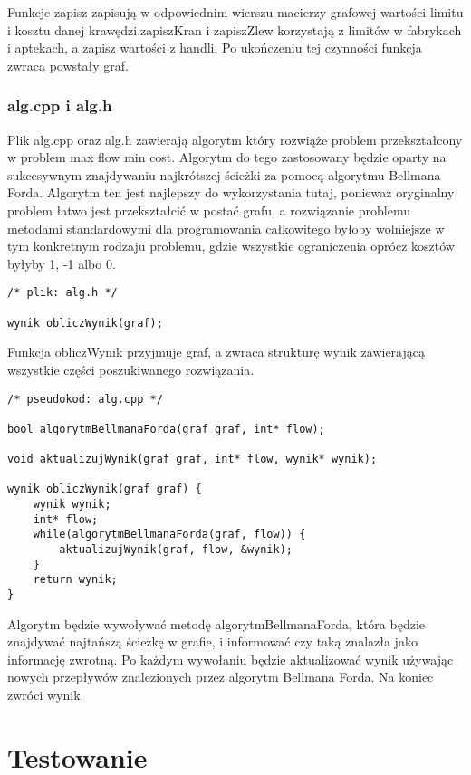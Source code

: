 \documentclass{article}
\begin{document}
Funkcje zapisz zapisują w odpowiednim wierszu macierzy grafowej wartości limitu i kosztu danej krawędzi.zapiszKran i zapiszZlew korzystają z limitów w fabrykach i aptekach, a zapisz wartości z handli. Po ukończeniu tej czynności funkcja zwraca powstały graf.

\subsubsection{alg.cpp i alg.h}

Plik alg.cpp oraz alg.h zawierają algorytm który rozwiąże problem przekształcony w problem max flow min cost. Algorytm do tego zastosowany będzie oparty na sukcesywnym znajdywaniu najkrótszej ścieżki za pomocą algorytmu Bellmana Forda. Algorytm ten jest najlepszy do wykorzystania tutaj, ponieważ oryginalny problem łatwo jest przekształcić w postać grafu, a rozwiązanie problemu metodami standardowymi dla programowania całkowitego byłoby wolniejsze w tym konkretnym rodzaju problemu, gdzie wszystkie ograniczenia oprócz kosztów byłyby 1, -1 albo 0.

\begin{lstlisting}
/* plik: alg.h */

wynik obliczWynik(graf);
\end{lstlisting}

Funkcja obliczWynik przyjmuje graf, a zwraca strukturę wynik zawierającą wszystkie części poszukiwanego rozwiązania.

\begin{lstlisting}
/* pseudokod: alg.cpp */

bool algorytmBellmanaForda(graf graf, int* flow);

void aktualizujWynik(graf graf, int* flow, wynik* wynik);

wynik obliczWynik(graf graf) {
	wynik wynik;
	int* flow;
	while(algorytmBellmanaForda(graf, flow)) {
		aktualizujWynik(graf, flow, &wynik);
	}
	return wynik;
}
\end{lstlisting}

Algorytm będzie wywoływać metodę algorytmBellmanaForda, która będzie znajdywać najtańszą ścieżkę w grafie, i informować czy taką znalazła jako informację zwrotną. Po każdym wywołaniu będzie aktualizować wynik używając nowych przepływów znalezionych przez algorytm Bellmana Forda. Na koniec zwróci wynik.

\section{Testowanie}
\end{document}
